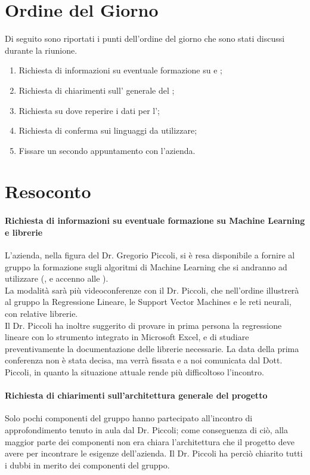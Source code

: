 \documentclass{article}
\begin{document}
\section{Ordine del Giorno}%
\label{ordine_del_giorno}
Di seguito sono riportati i punti dell'ordine del giorno che sono stati discussi durante la riunione.
\begin{enumerate}
  \item Richiesta di informazioni su eventuale formazione su  e ;
  \item Richiesta di chiarimenti sull' generale del ;
  \item Richiesta su dove reperire i dati per l';
  \item Richiesta di conferma sui linguaggi da utilizzare;
  \item Fissare un secondo appuntamento con l'azienda.
\end{enumerate}

\section{Resoconto}%
\label{resoconto}
\paragraph*{Richiesta di informazioni su eventuale formazione su Machine Learning e librerie}
L'azienda, nella figura del Dr. Gregorio Piccoli, si è resa disponibile a fornire al gruppo la formazione sugli algoritmi di Machine Learning che si andranno ad utilizzare (,  e accenno alle ). \\
La modalità sarà più videoconferenze con il Dr. Piccoli, che nell'ordine illustrerà al gruppo la Regressione Lineare, le Support Vector Machines e le reti neurali, con relative librerie. \\
Il Dr. Piccoli ha inoltre suggerito di provare in prima persona la regressione lineare con lo strumento integrato in Microsoft Excel, e di studiare preventivamente la documentazione delle librerie necessarie. La data della prima conferenza non è stata decisa, ma verrà fissata e a noi comunicata dal Dott. Piccoli, in quanto la situazione attuale rende più difficoltoso l'incontro.

\paragraph*{Richiesta di chiarimenti sull'architettura generale del progetto}
Solo pochi componenti del gruppo hanno partecipato all'incontro di approfondimento tenuto in aula dal Dr. Piccoli; come conseguenza di ciò, alla maggior parte dei componenti non era chiara l'architettura che il progetto deve avere per incontrare le
esigenze dell'azienda. Il Dr. Piccoli ha perciò chiarito tutti i dubbi in merito dei componenti del gruppo.
\end{document}
